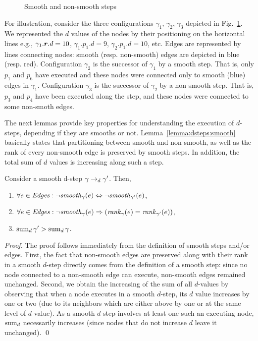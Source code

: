 \begin{figure}[th]
  \centering
  \scalebox{0.9}{}
  \caption{\label{fig:d-steps}Smooth and non-smooth steps}
\end{figure}

For illustration, consider the three configurations $\gamma_1$,
$\gamma_2$, $\gamma_3$ depicted in Fig.~\ref{fig:d-steps}.  We
represented the $d$ values of the nodes by their positioning on the
horizontal lines e.g., $\gamma_1.\boldsymbol{r}.d = 10$, $\gamma_1.p_1.d = 9$,
$\gamma_2.p_1.d = 10$, etc.  Edges are represented by lines
connecting nodes: smooth (resp. non-smooth) edges are depicted in
blue (resp. red).  Configuration $\gamma_2$ is the successor of
$\gamma_1$ by a smooth step.  That is, only $p_1$ and $p_6$ have
executed and these nodes were connected only to smooth (blue) edges
in $\gamma_1$.  Configuration $\gamma_3$ is the successor of
$\gamma_2$ by a non-smooth step.  That is, $p_3$ and $p_4$ have been
executed along the step, and these nodes were connected to some
non-smoth edges.

The next lemmas provide key properties for understanding the execution
of $d$-steps, depending if they are smooths or not.
Lemma~\ref{lemma:dsteps:smooth} basically states that partitioning
between smooth and non-smooth, as well as the rank of every non-smooth
edge is preserved by smooth steps.  In addition, the total sum of $d$
values is increasing along such a step.  

\begin{lemma}\label{lemma:dsteps:smooth}
  Consider a smooth d-step $\gamma \rightarrow_d \gamma'$.  Then,
  \begin{enumerate}[label=(\roman*)]
  \item $\forall e \in \mathit{Edges}: \neg \mathit{smooth}_{\gamma}(e) \Leftrightarrow
    \neg \mathit{smooth}_{\gamma'}(e)$,
  \item $\forall e \in \mathit{Edges}: \neg \mathit{smooth}_{\gamma}(e) \Rightarrow
    (\mathit{rank}_{\gamma}(e) = \mathit{rank}_{\gamma'}(e))$,
  \item $\mathop{\mathrm{sum}_d} \gamma' > \mathop{\mathrm{sum}_d} \gamma$.
  \end{enumerate}
\end{lemma}
\begin{proof}
  The proof follows immediately from the definition of smooth steps
  and/or edges.  First, the fact that non-smooth edges are preserved
  along with their rank in a smooth $d$-step directly comes from the
  definition of a smooth step: since no node connected to a non-smooth
  edge can execute, non-smooth edges remained unchanged.
  Second, we obtain the increasing of the sum of all $d$-values by
  observing that when a node executes in a smooth $d$-step, its $d$
  value increases by one or two (due to its neighbors which are either
  above by one or at the same level of $d$ value). As a smooth
  $d$-step involves at least one such an executing node, $\mathop{\mathrm{sum}_d}$
  necessarily increases (since nodes that do not increase $d$ leave it
  unchanged).
  \qed
\end{proof}


